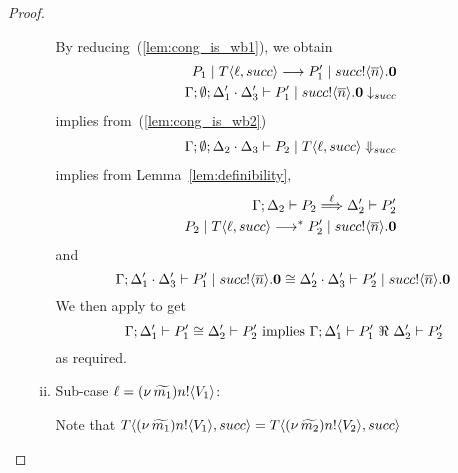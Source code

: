 \begin{proof}
\begin{enumerate}
\begin{enumerate}[i.]
						\noi By reducing~(\ref{lem:cong_is_wb1}), we obtain
						\begin{eqnarray*}
							&& P_1 \;|\; T\langle \ell, succ \rangle \longrightarrow P_1' \;|\; succ ! \langle \overline{n} \rangle . \mathbf{0} \\
							&& \Gamma; \emptyset; \Delta_1' \cdot \Delta_3' \vdash P_1' \;|\; succ ! \langle \overline{n} \rangle . \mathbf{0} \downarrow_{succ}
						\end{eqnarray*}
						\noi implies from~(\ref{lem:cong_is_wb2})
						\begin{eqnarray*}
							&& \Gamma; \emptyset; \Delta_2 \cdot \Delta_3 \vdash P_2 \;|\; T\langle \ell, succ \rangle \Downarrow_{succ}
						\end{eqnarray*}
						\noi implies from Lemma~\ref{lem:definibility},
						\begin{eqnarray*}
							&& \Gamma; \Delta_2 \vdash P_2 \stackrel{\ell}{\Longrightarrow} \Delta_2' \vdash P_2'\\
							&& P_2 \;|\; T \langle \ell, succ \rangle \longrightarrow^{*} P_2' \;|\; succ ! \langle \overline{n} \rangle . \mathbf{0}
						\end{eqnarray*}
						\noi and
						\[
							\Gamma; \Delta_1' \cdot \Delta_3' \vdash P_1' \;|\; succ ! \langle \overline{n} \rangle .\mathbf{0} \cong \Delta_2' \cdot \Delta_3' \vdash P_2' \;|\; succ ! \langle \overline{n} \rangle . \mathbf{0}
						\]
						We then apply  to get
						\[
							\horel{\Gamma}{\Delta_1'}{P_1'}{\cong}{\Delta_2'}{P_2'} \text{ implies } \horel{\Gamma}{\Delta_1'}{P_1'}{\ \Re\ }{\Delta_2'}{P_2'}
						\]
						\noi as required.

				\item	Sub-case $\ell = (\nu\, \widetilde{m_1}) n ! \langle V_1 \rangle$:

						\noi Note that $T\langle (\nu\, \widetilde{m_1}) n ! \langle V_1 \rangle, succ \rangle = T\langle (\nu\, \widetilde{m_2}) n ! \langle V_2 \rangle, succ \rangle$


\end{enumerate}
\end{enumerate}
\end{proof}

